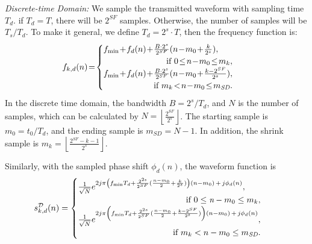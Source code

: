 \documentclass{IEEEtaes}
\theoremstyle{plain}
\begin{document}
\textit{Discrete-time Domain:}
We sample the transmitted waveform with sampling time $T_d$. if $T_d = T$, there will be $2^{SF}$ samples. Otherwise, the number of samples will be $T_s/T_d$.  To make it general, we define $T_d = 2^s\cdot T$, then the frequency function is:
\begin{equation}
  \label{lora-dis-f}
  \begin{aligned} 
    f_{k,d}(n) & \!=\!\begin{cases}
      f_{\min}\!+\!f_d(n)\!+\!\frac{B\cdot2^s}{2^{SF}}(n\!-\!m_0\!+\!\frac{k}{2^s}),
      \\
      \hfill\text{if }0\!\le\! n\!-\!m_0 \!\le\! m_k,\\
      f_{\min}\!+\!f_d(n)\!+\!\frac{B\cdot2^s}{2^{SF}}(n\!-\!m_0\!+\!\frac{k-2^{SF}}{2^s}),
      \\
      \hfill\text{if }m_k \!<\!n\!-\!m_0 \!\le\! m_{\textit{SD}}. 
    \end{cases}
  \end{aligned}
\end{equation}
In the discrete time domain, the bandwidth $B=2^{\textit{s}}/T_d$, and $N$ is the number of samples, which can be calculated by $N = \left \lfloor \frac{2^{SF}}{2^s}  \right \rfloor$. The starting sample is $\textit{m}_0=t_0/T_d$, and the ending sample is $m_{\textit{SD}}=N-1$. In addition, the shrink sample is $m_k = \left \lfloor \frac{2^{SF}-k-1}{2^s}  \right \rfloor$. 

Similarly, with the sampled phase shift $\phi_d(n)$, the waveform function is 
\begin{equation}
  \label{lora-dis-wave}
  \begin{aligned} 
    s^{\mathcal{D}} _{k,d}(n) & =\begin{cases}
      \frac{1}{\sqrt{N}}e^{2j\pi \left(f_{\min}T_d+\frac{2^{2\textit{s}}}{2^{SF}}(\frac{n-m_0}{2} +\frac{k}{2^s})\right)(n-m_0)\,+\, j\phi_d(n)} , \\
      \hfill \text{ if }0\le \textit{n}-m_0 \le m_k,\\
      \frac{1}{\sqrt{N}}e^{2j\pi \left(f_{\min}T_d+\frac{2^{2s}}{2^{SF}}(\frac{n-m_0}{2}+\frac{k-2^{SF}}{2^s})\right)(n-m_0) \,+\, j\phi_d(n)}, \\
      \hfill \text{ if }m_k <  n-m_0 \le m_{\textit{SD}}.
    \end{cases}
  \end{aligned}
\end{equation}
\end{document}
